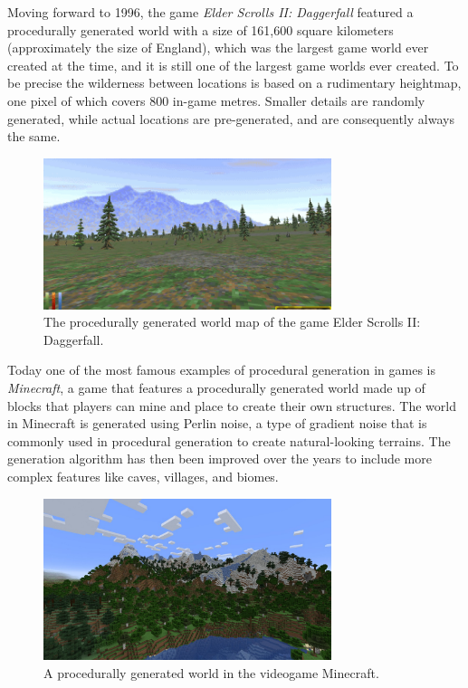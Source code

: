 \documentclass{report}
\begin{document}
Moving forward to 1996, the game \textit{Elder Scrolls II: Daggerfall} featured a procedurally generated world with a size of 161,600 square kilometers (approximately the size of England), which was the largest game world ever created at the time, and it is still one of the largest game worlds ever created.
To be precise the wilderness between locations is based on a rudimentary heightmap, one pixel of which covers 800 in-game metres.
Smaller details are randomly generated, while actual locations are pre-generated, and are consequently always the same.

\begin{figure}[h!]
  \centering
  \includegraphics[width=0.75\textwidth]{img/daggerfall.png}
  \caption{The procedurally generated world map of the game Elder Scrolls II: Daggerfall.}
  \label{fig:daggerfall}
\end{figure}

Today one of the most famous examples of procedural generation in games is \textit{Minecraft}, a game that features a procedurally generated world made up of blocks that players can mine and place to create their own structures.
The world in Minecraft is generated using Perlin noise, a type of gradient noise that is commonly used in procedural generation to create natural-looking terrains.
The generation algorithm has then been improved over the years to include more complex features like caves, villages, and biomes.

\begin{figure}[h!]
  \centering
  \includegraphics[width=0.75\textwidth]{img/minecraft.jpg}
  \caption{A procedurally generated world in the videogame Minecraft.}
  \label{fig:minecraft}
\end{figure}
\end{document}
